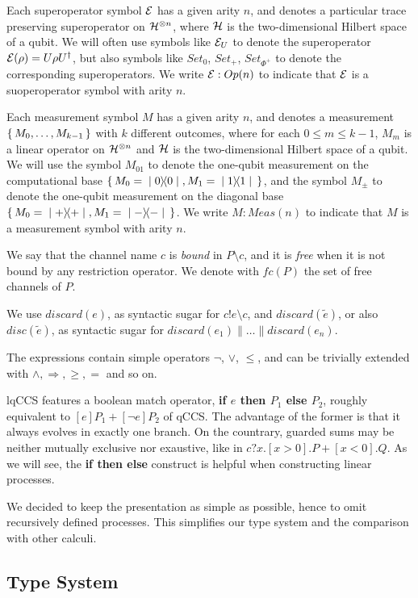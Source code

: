 Each superoperator symbol $\mathcal{E}$ has a given arity $n$, and denotes a particular trace preserving superoperator on $\mathcal{H}^{\otimes n}$, where $\mathcal{H}$ is the two-dimensional Hilbert space of a qubit. We will often use symbols like $\mathcal{E}_U$ to denote the superoperator $\mathcal{E}(\rho) = U \rho U^\dagger$, but also symbols like $Set_0$, $Set_+$, 
$Set_{\Phi^+}$ to denote the corresponding superoperators. We write $\mathcal{E}: Op(n)$ to indicate  that $\mathcal{E}$ is a suoperoperator symbol with arity $n$.

Each measurement symbol $M$ has a given arity $n$, and denotes a measurement $\set{M_0, \ldots, M_{k-1}}$ with $k$ different outcomes, where for each $0 \leq m \leq k-1$, $M_m$ is a linear operator on $\mathcal{H}^{\otimes n}$ and $\mathcal{H}$ is the two-dimensional Hilbert space of a qubit. We will use the symbol $M_{01}$ to denote the one-qubit measurement on the computational base $\set{M_0 = \ket{0}\!\!\bra{0}, M_1=\ket{1}\!\!\bra{1}}$, and the symbol $M_\pm$ to denote the one-qubit measurement on the diagonal base $\set{M_0 = \ket{+}\!\!\bra{+}, M_1 = \ket{-}\!\!\bra{-}}$. We write $M: Meas(n)$ to indicate  that $M$ is a measurement symbol with arity $n$.

We say that the channel name $c$ is \textit{bound} in $P\setminus c$, and it is \textit{free} when it is not bound by any restriction operator. We denote with $\mathit{fc}(P)$ the set of free channels of $P$.

We use $discard(e)$, as syntactic sugar for $c!e \setminus c$, and $discard(\widetilde{e})$, or also $disc(\widetilde{e})$, as syntactic sugar for $discard(e_1)\parallel \ldots\parallel discard(e_n)$.

The expressions contain simple operators $\neg$, $\vee$, $\leq$, and  can be trivially extended with $\wedge, \Rightarrow, \geq, =$ and so on.

lqCCS features a boolean match operator, \textbf{if $e$ then $P_1$ else $P_2$}, roughly equivalent to $[e]P_1 + [\neg e]P_2$ of qCCS. The advantage of the former is that it always evolves in exactly one branch. On the countrary, guarded sums may be neither mutually  exclusive nor exaustive, like in $c?x.[x > 0].P + [x < 0].Q$. As we will see, the \textbf{if then else} construct is helpful when constructing linear processes.

We decided to keep the presentation as simple as possible, hence to omit recursively defined processes. This simplifies our type system and the comparison with other calculi.


\subsection{Type System}

